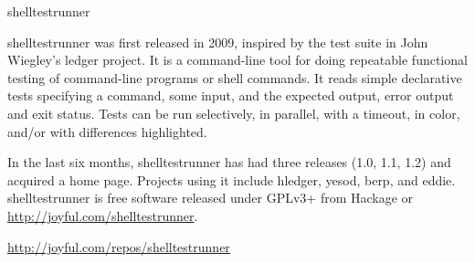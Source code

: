 \begin{hcarentry}[new]{shelltestrunner}
\makeheader

shelltestrunner was first released in 2009, inspired by the test suite
in John Wiegley's ledger project. It is a command-line tool for doing
repeatable functional testing of command-line programs or shell
commands. It reads simple declarative tests specifying a command, some
input, and the expected output, error output and exit status. Tests
can be run selectively, in parallel, with a timeout, in color, and/or
with differences highlighted. 

In the last six months, shelltestrunner has had three releases (1.0,
1.1, 1.2) and acquired a home page. Projects using it include hledger,
yesod, berp, and eddie. shelltestrunner is free software released
under GPLv3+ from Hackage or \url{http://joyful.com/shelltestrunner}.

\FurtherReading
  \url{http://joyful.com/repos/shelltestrunner}
\end{hcarentry}

